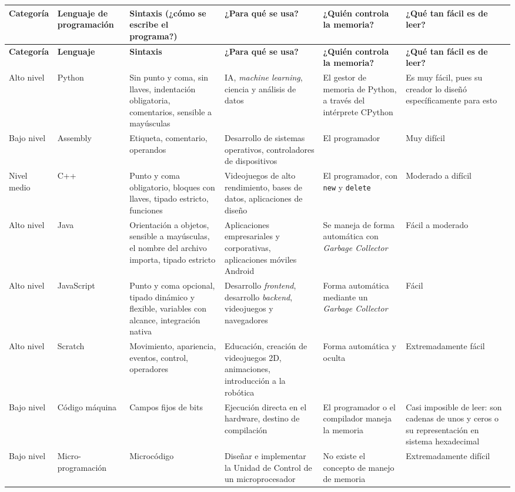 \documentclass[12pt,letterpaper]{article}
\begin{document}
{\singlespacing\footnotesize
\setlength{\tabcolsep}{3pt}
\renewcommand{\arraystretch}{1.25}
\begin{longtable}{@{}p{1.4cm}p{1.9cm}p{3.3cm}p{3.2cm}p{3.0cm}p{2.7cm}@{}}
\toprule
\textbf{Categoría} & \textbf{Lenguaje de programación} & \textbf{Sintaxis (¿cómo se escribe el programa?)} & \textbf{¿Para qué se usa?} & \textbf{¿Quién controla la memoria?} & \textbf{¿Qué tan fácil es de leer?} \\
\midrule
\endfirsthead
\toprule
\textbf{Categoría} & \textbf{Lenguaje} & \textbf{Sintaxis} & \textbf{¿Para qué se usa?} & \textbf{¿Quién controla la memoria?} & \textbf{¿Qué tan fácil es de leer?} \\
\midrule
\endhead
\bottomrule
\endfoot
Alto nivel & Python & Sin punto y coma, sin llaves, indentación obligatoria, comentarios, sensible a mayúsculas & IA, \textit{machine learning}, ciencia y análisis de datos & El gestor de memoria de Python, a través del intérprete CPython & Es muy fácil, pues su creador lo diseñó específicamente para esto \\ \addlinespace
Bajo nivel & Assembly & Etiqueta, comentario, operandos & Desarrollo de sistemas operativos, controladores de dispositivos & El programador & Muy difícil \\ \addlinespace
Nivel medio & C++ & Punto y coma obligatorio, bloques con llaves, tipado estricto, funciones & Videojuegos de alto rendimiento, bases de datos, aplicaciones de diseño & El programador, con \texttt{new} y \texttt{delete} & Moderado a difícil \\ \addlinespace
Alto nivel & Java & Orientación a objetos, sensible a mayúsculas, el nombre del archivo importa, tipado estricto & Aplicaciones empresariales y corporativas, aplicaciones móviles Android & Se maneja de forma automática con \textit{Garbage Collector} & Fácil a moderado \\ \addlinespace
Alto nivel & JavaScript & Punto y coma opcional, tipado dinámico y flexible, variables con alcance, integración nativa & Desarrollo \textit{frontend}, desarrollo \textit{backend}, videojuegos y navegadores & Forma automática mediante un \textit{Garbage Collector} & Fácil \\ \addlinespace
Alto nivel & Scratch & Movimiento, apariencia, eventos, control, operadores & Educación, creación de videojuegos 2D, animaciones, introducción a la robótica & Forma automática y oculta & Extremadamente fácil \\ \addlinespace
Bajo nivel & Código máquina & Campos fijos de bits & Ejecución directa en el hardware, destino de compilación & El programador o el compilador maneja la memoria & Casi imposible de leer: son cadenas de unos y ceros o su representación en sistema hexadecimal \\ \addlinespace
Bajo nivel & Micro-programación & Microcódigo & Diseñar e implementar la Unidad de Control de un microprocesador & No existe el concepto de manejo de memoria & Extremadamente difícil \\
\end{longtable}}
\doublespacing
\end{document}
